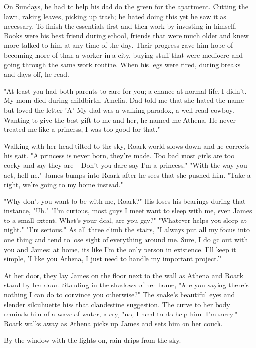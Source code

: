 		On Sundays, he had to help his dad do the green for the apartment. Cutting the lawn, raking leaves, picking up trash; he hated doing
	this yet he saw it as necessary. To finish the essentials first and then work by investing in himself. Books were his best friend during
	school, friends that were much older and knew more talked to him at any time of the day. Their progress gave him hope of becoming more of than
	a worker in a city, buying stuff that were mediocre and going through the same work routine. When his legs were tired, during breaks and days
	off, he read.

		"At least you had both parents to care for you; a chance at normal life. I didn't. My mom died during childbirth, Amelia. Dad told me
	that she hated the name but loved the letter 'A.' My dad was a walking paradox, a well-read cowboy. Wanting to give the best gift to me and
	her, he named me Athena. He never treated me like a princess, I was too good for that."

		Walking with her head tilted to the sky, Roark world slows down and he corrects his gait. "A princess is never born, they're made. 
	Too bad most girls are too cocky and say they are -- Don't you dare say I'm a princess." "With the way you act, hell no." James bumps into
	Roark after he sees that she pushed him. "Take a right, we're going to my home instead." 

		"Why don't you want to be with me, Roark?" His loses his bearings during that instance, "Uh." "I'm curious, most guys I meet want to
	sleep with me, even James to a small extent. What's your deal, are you gay?" "Whatever helps you sleep at night." "I'm serious." As all
	three climb the stairs, "I always put all my focus into one thing and tend to lose sight of everything around me. Sure, I do go out with you
	and James; at home, its like I'm the only person in existence. I'll keep it simple, 'I like you Athena, I just need to handle my important
	project.'"

		At her door, they lay James on the floor next to the wall as Athena and Roark stand by her door. Standing in the shadows of her home,
	"Are you saying there's nothing I can do to convince you otherwise?" The snake's beautiful eyes and slender silouhuette hiss that clandestine
	suggestion. The curve to her body reminds him of a wave of water, a cry, "no, I need to do help him. I'm sorry." Roark walks away as Athena
	picks up James and sets him on her couch.

		By the window with the lights on, rain drips from the sky. 

